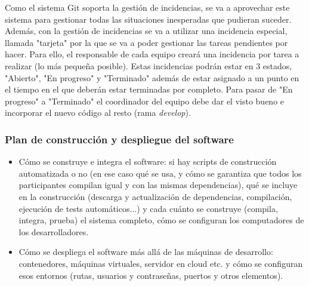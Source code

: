 \documentclass[12pt]{article}%
\begin{document}
Como el sistema Git soporta la gesti\'on de incidencias, se va a aprovechar este sistema para gestionar todas las situaciones inesperadas que pudieran suceder. Adem\'as, con la gesti\'on de incidencias se va a utilizar una incidencia especial, llamada "tarjeta" por la que se va a poder gestionar las tareas pendientes por hacer. Para ello, el responsable de cada equipo crear\'a una incidencia por tarea a realizar (lo m\'as peque\~na posible). Estas incidencias podr\'an estar en 3 estados, "Abierto", "En progreso" y "Terminado" adem\'as de estar asignado a un punto en el tiempo en el que deber\'an estar terminadas por completo. Para pasar de "En progreso" a "Terminado" el coordinador del equipo debe dar el visto bueno e incorporar el nuevo c\'odigo al resto (rama \textit{develop}).\\

\subsubsection{Plan de construcci\'on y despliegue del software}

\begin{itemize}
	\item C\'omo se construye e integra el software: si hay scripts de construcci\'on automatizada o no (en ese caso qu\'e se usa, y c\'omo se garantiza que todos los participantes compilan igual y con las mismas dependencias), qu\'e se incluye en la construcci\'on (descarga y actualizaci\'on de dependencias, compilaci\'on, ejecuci\'on de tests autom\'aticos...) y cada cu\'anto se construye (compila, integra, prueba) el sistema completo, c\'omo se configuran los computadores de los desarrolladores.
	\item C\'omo se despliega el software m\'as all\'a de las m\'aquinas de desarrollo: contenedores, m\'aquinas virtuales, servidor en cloud etc. y c\'omo se configuran esos entornos (rutas, usuarios y contrase\~nas, puertos y otros elementos).
\end{itemize}


\end{document}
